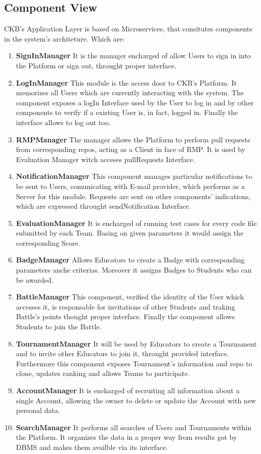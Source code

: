 \subsection{Component View}
CKB's Application Layer is based on Microservices, that consitutes components in the system's architeture.
Which are:
\begin{enumerate}
    \item \textbf{SignInManager} It is the manager encharged of allow Users to sign in into the Platform or sign out, throught proper interface.
    \item \textbf{LogInManager} This module is the access door to CKB's Platform. It memorizes all Users which are currently interacting with the system. The component exposes a logIn Interface used by the User to log in and by other components to verify if a existing User is, in fact, logged in. Finally the interface allows to log out too.
    \item \textbf{RMPManager} The manager allows the Platform to perform pull requests from corresponding repos, acting as a Client in face of RMP. It is used by Evaluation Manager witch acceses pullRequests Interface.
    \item \textbf{NotificationManager} This component manages particular notifications to be sent to Users, comunicating with E-mail provider, which performs as a Server for this module. Requests are sent on other components' indications, which are expressed throught sendNotification Interface.
    \item \textbf{EvaluationManager} It is encharged of running test cases for every code file submitted by each Team. Basing on given parameters it would assign the corresponding Score.
    \item \textbf{BadgeManager} Allows Educators to create a Badge with corresponding parameters anche criterias. Moreover it assigns Badges to Students who can be awarded.
    \item \textbf{BattleManager} This component, verified the identity of the User which accesses it, is responsable for invitations of other Students and traking Battle's points thought proper interface. Finally the component allows Students to join the Battle.
    \item \textbf{TournamentManager} It will be used by Educators to create a Tournament and to invite other Educators to join it, throught provided interface. Furthermore this component exposes Tournament's information and repo to clone, updates ranking and allows Teams to participate.
    \item \textbf{AccountManager} It is encharged of recruiting all information about a single Account, allowing the owner to delete or update the Account with new personal data.
    \item \textbf{SearchManager} It performs all searches of Users and Tournaments within the Platform. It organizes the data in a proper way from results got by DBMS and makes them availble via its interface.
\end{enumerate}
